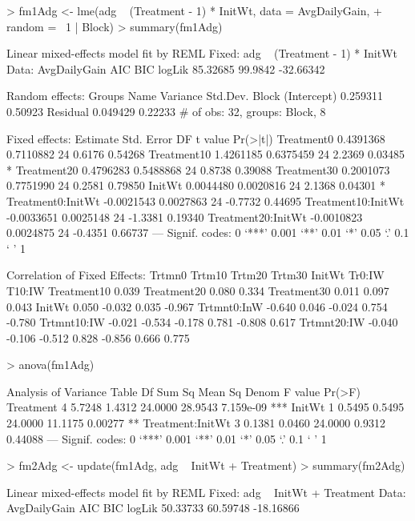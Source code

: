 \documentclass[12pt]{article}
\begin{document}
\begin{Schunk}
\begin{Sinput}
> fm1Adg <- lme(adg ~ (Treatment - 1) * InitWt, data = AvgDailyGain, 
+     random = ~1 | Block)
> summary(fm1Adg)
\end{Sinput}
\begin{Soutput}
Linear mixed-effects model fit by REML
Fixed: adg ~ (Treatment - 1) * InitWt 
 Data: AvgDailyGain 
      AIC     BIC    logLik
 85.32685 99.9842 -32.66342

Random effects:
 Groups   Name        Variance Std.Dev.
 Block    (Intercept) 0.259311 0.50923 
 Residual             0.049429 0.22233 
# of obs: 32, groups: Block, 8

Fixed effects:
                     Estimate Std. Error DF t value Pr(>|t|)  
Treatment0          0.4391368  0.7110882 24  0.6176  0.54268  
Treatment10         1.4261185  0.6375459 24  2.2369  0.03485 *
Treatment20         0.4796283  0.5488868 24  0.8738  0.39088  
Treatment30         0.2001073  0.7751990 24  0.2581  0.79850  
InitWt              0.0044480  0.0020816 24  2.1368  0.04301 *
Treatment0:InitWt  -0.0021543  0.0027863 24 -0.7732  0.44695  
Treatment10:InitWt -0.0033651  0.0025148 24 -1.3381  0.19340  
Treatment20:InitWt -0.0010823  0.0024875 24 -0.4351  0.66737  
---
Signif. codes:  0 `***' 0.001 `**' 0.01 `*' 0.05 `.' 0.1 ` ' 1 

Correlation of Fixed Effects:
            Trtmn0 Trtm10 Trtm20 Trtm30 InitWt Tr0:IW T10:IW
Treatment10  0.039                                          
Treatment20  0.080  0.334                                   
Treatment30  0.011  0.097  0.043                            
InitWt       0.050 -0.032  0.035 -0.967                     
Trtmnt0:InW -0.640  0.046 -0.024  0.754 -0.780              
Trtmnt10:IW -0.021 -0.534 -0.178  0.781 -0.808  0.617       
Trtmnt20:IW -0.040 -0.106 -0.512  0.828 -0.856  0.666  0.775
\end{Soutput}
\begin{Sinput}
> anova(fm1Adg)
\end{Sinput}
\begin{Soutput}
Analysis of Variance Table
                 Df  Sum Sq Mean Sq   Denom F value    Pr(>F)    
Treatment         4  5.7248  1.4312 24.0000 28.9543 7.159e-09 ***
InitWt            1  0.5495  0.5495 24.0000 11.1175   0.00277 ** 
Treatment:InitWt  3  0.1381  0.0460 24.0000  0.9312   0.44088    
---
Signif. codes:  0 `***' 0.001 `**' 0.01 `*' 0.05 `.' 0.1 ` ' 1 
\end{Soutput}
\begin{Sinput}
> fm2Adg <- update(fm1Adg, adg ~ InitWt + Treatment)
> summary(fm2Adg)
\end{Sinput}
\begin{Soutput}
Linear mixed-effects model fit by REML
Fixed: adg ~ InitWt + Treatment 
 Data: AvgDailyGain 
      AIC      BIC    logLik
 50.33733 60.59748 -18.16866


\end{Soutput}
\end{Schunk}
\end{document}
